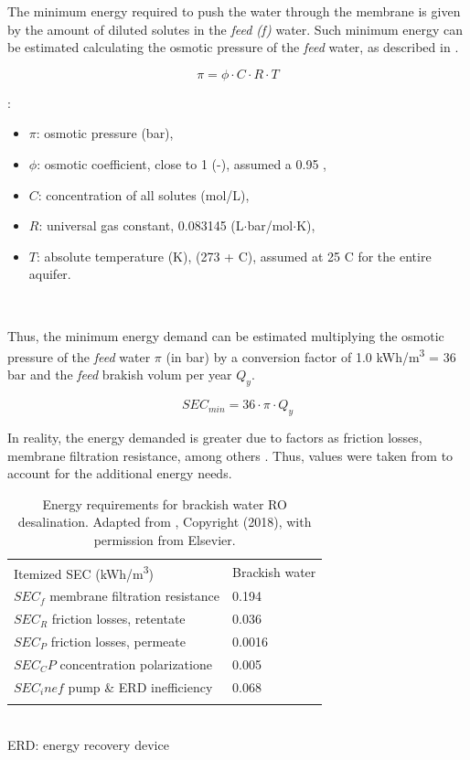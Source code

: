 \documentclass[12pt]{iopart}
\begin{document}
The minimum energy required to push the water through the membrane is given by the amount of diluted solutes in the \textit{feed (f)} water. Such minimum energy can be estimated calculating the osmotic pressure of the \textit{feed} water, as described in  \cite{crittenden_mwhs_2012}.

\begin{equation}\label{eq:6}
\pi = \phi\cdot C\cdot R\cdot T
\end{equation}

:
\begin{itemize}[label={-}]
	\item $\pi$: osmotic pressure (bar),
	\item $\phi$: osmotic coefficient, close to 1 (-), assumed a 0.95 \cite{crittenden_mwhs_2012},
	\item $C$: concentration of all solutes (mol/L),
	\item $R$: universal gas constant, 0.083145 (L$\cdot$bar/mol$\cdot$K),
	\item $T$: absolute temperature (K), (273 + \degree C), assumed at 25 \degree C for the entire aquifer.
\end{itemize}~

Thus, the minimum energy demand can be estimated multiplying the osmotic pressure of the \textit{feed} water $\pi$ (in bar) by a conversion factor of 1.0 kWh/m\textsuperscript{3} = 36 bar and the \textit{feed} brakish volum per year $Q_y$. 

\begin{equation}\label{eq:7}
SEC_{min} = 36 \cdot \pi \cdot Q_y
\end{equation}

In reality, the energy demanded is greater due to factors as friction losses, membrane filtration resistance, among others \cite{karabelasAnalysisSpecificEnergy2018a,panBrackishWaterDesalination2020}. Thus, values were taken from \cite{karabelasAnalysisSpecificEnergy2018a} to account for the additional energy needs.

\begin{table}[!ht]
	\caption{\label{tbl:rodesal}Energy requirements for brackish water RO desalination. Adapted from \cite{karabelasAnalysisSpecificEnergy2018a}, Copyright (2018), with permission from Elsevier.}
	\footnotesize
	\begin{tabular}{@{}*{2}l}
		\br
		Itemized SEC (kWh/m\textsuperscript{3}) & Brackish water\\
		\mr
		$SEC_f$ membrane filtration resistance & 0.194\\
		$SEC_R$ friction losses, retentate & 0.036\\
		$SEC_P$ friction losses, permeate & 0.0016\\
		$SEC_CP$ concentration polarizatione & 0.005\\
		$SEC_inef$ pump \& ERD inefficiency & 0.068\\
		\br
	\end{tabular}\\
	ERD: energy recovery device
\end{table}
\end{document}
